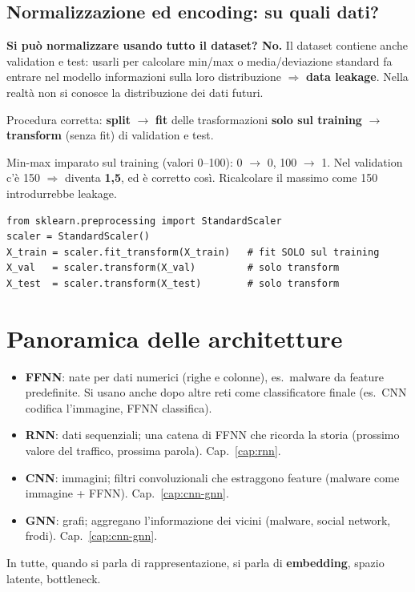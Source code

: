 \subsection{Normalizzazione ed encoding: su quali dati?}
\label{sec:leak-norm}
\begin{esame}
\textbf{Si può normalizzare usando tutto il dataset? No.} Il dataset contiene anche validation e test: usarli per calcolare
min/max o media/deviazione standard fa entrare nel modello informazioni sulla loro distribuzione $\Rightarrow$
\textbf{data leakage}. Nella realtà non si conosce la distribuzione dei dati futuri.

Procedura corretta: \textbf{split} $\to$ \textbf{fit} delle trasformazioni \textbf{solo sul training} $\to$ \textbf{transform}
(senza fit) di validation e test.
\end{esame}
\begin{esempio}
Min-max imparato sul training (valori 0--100): 0 $\to$ 0, 100 $\to$ 1. Nel validation c'è 150 $\Rightarrow$ diventa
\textbf{1,5}, ed è corretto così. Ricalcolare il massimo come 150 introdurrebbe leakage.
\end{esempio}
\begin{lstlisting}
from sklearn.preprocessing import StandardScaler
scaler = StandardScaler()
X_train = scaler.fit_transform(X_train)   # fit SOLO sul training
X_val   = scaler.transform(X_val)         # solo transform
X_test  = scaler.transform(X_test)        # solo transform
\end{lstlisting}

\section{Panoramica delle architetture}
\begin{itemize}
  \item \textbf{FFNN}: nate per dati numerici (righe e colonne), es.\ malware da feature predefinite. Si usano anche dopo altre
        reti come classificatore finale (es.\ CNN codifica l'immagine, FFNN classifica).
  \item \textbf{RNN}: dati sequenziali; una catena di FFNN che ricorda la storia (prossimo valore del traffico, prossima parola).
        Cap.~\ref{cap:rnn}.
  \item \textbf{CNN}: immagini; filtri convoluzionali che estraggono feature (malware come immagine + FFNN). Cap.~\ref{cap:cnn-gnn}.
  \item \textbf{GNN}: grafi; aggregano l'informazione dei vicini (malware, social network, frodi). Cap.~\ref{cap:cnn-gnn}.
\end{itemize}
In tutte, quando si parla di rappresentazione, si parla di \textbf{embedding}, spazio latente, bottleneck.

